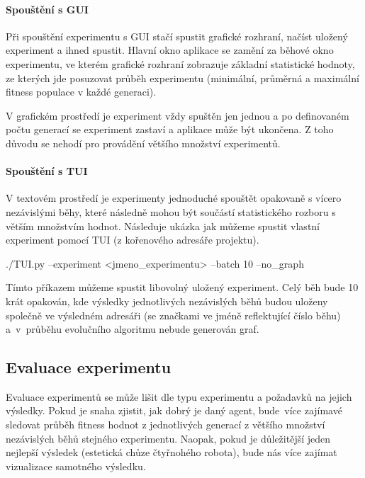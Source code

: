\paragraph{Spouštění s GUI}
Při spouštění experimentu s GUI stačí spustit grafické rozhraní, načíst uložený
experiment a ihned spustit. Hlavní okno aplikace se zamění za běhové okno
experimentu, ve kterém grafické rozhraní zobrazuje základní statistické
hodnoty, ze kterých jde posuzovat průběh experimentu (minimální, průměrná a
maximální fitness populace v každé generaci). 

V grafickém prostředí je experiment vždy spuštěn jen jednou a po definovaném
počtu generací se experiment zastaví a aplikace může být ukončena. Z toho
důvodu se nehodí pro provádění většího množství experimentů.

\paragraph{Spouštění s TUI}
V textovém prostředí je experimenty jednoduché spouštět opakovaně s vícero
nezávislými běhy, které následně mohou být součástí statistického rozboru s
větším množstvím hodnot. Následuje ukázka jak můžeme spustit vlastní
experiment pomocí TUI (z kořenového adresáře projektu).
\begin{code}
./TUI.py --experiment <jmeno_experimentu> --batch 10 --no_graph
\end{code}
Tímto příkazem můžeme spustit libovolný uložený experiment. Celý běh bude 10
krát opakován, kde výsledky jednotlivých nezávislých běhů budou uloženy
společně ve výsledném adresáři (se značkami ve jméně reflektující číslo běhu)
a~v~průběhu evolučního algoritmu nebude generován graf.

\subsection{Evaluace experimentu} \label{doc_23_seasoning}
Evaluace experimentů se může lišit dle typu experimentu a požadavků na jejich
výsledky. Pokud je snaha zjistit, jak dobrý je daný agent, bude~více zajímavé
sledovat průběh fitness hodnot z jednotlivých generací z většího množství
nezávislých běhů stejného experimentu. Naopak, pokud je důležitější jeden
nejlepší výsledek (estetická chůze čtyřnohého robota), bude nás více zajímat
vizualizace samotného výsledku.

